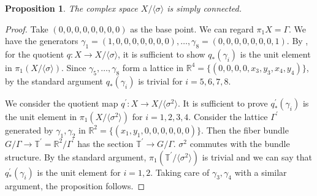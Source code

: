 \documentclass[12pt,reqno]{amsart}
\newtheorem{prop}[thm]{Proposition}
\theoremstyle{definition}
\newcommand{\Z}{\mathbb{Z}}
\newcommand{\R}{\mathbb{R}}
\newcommand{\C}{\mathbb{C}}
\newcommand{\T}{\mathbb{T}}
\begin{document}




\begin{prop}
 The complex space $X/\langle\sigma \rangle$ is simply connected. 
\end{prop}
\begin{proof}
Take $(0,0,0,0,0,0,0,0)$ as the base point.
We can regard $\pi_{1}X=\Gamma$.
We have the generators 
$\gamma_{1}=(1,0,0,0,0,0,0,0),\dots ,\gamma_{8}=(0,0,0,0,0,0,0,1)$.
By \cite[Corollary 6.3]{Bre}, for the quotient $q:X\to X /\langle\sigma \rangle$, it is sufficient to show $q_{*}(\gamma_{i})$ is the unit element in $\pi_{1}(X/\langle\sigma \rangle)$.
Since $\gamma_{5},\dots, \gamma_{8}$ form a lattice in $\R^{4}=\{(0,0,0,0,x_3,y_3,x_4,y_4)\}$,
by the standard argument $q_{*}(\gamma_{i})$ is trivial for $i=5,6,7,8$.

We consider the quotient map $q^{'}:X\to X /\langle\sigma^2 \rangle$.
It is sufficient to prove $q^{'}_{*}(\gamma_{i})$ is the unit element in $\pi_{1}(X/\langle\sigma^2 \rangle)$ for $i=1,2,3,4$.
Consider the lattice $\Gamma^{'}$ generated by $\gamma_{1}, \gamma_{2}$ in $\R^{2}=\{(x_{1},y_{1},0,0,0,0,0,0)\}$.
Then the fiber bundle $G/\Gamma\to \T^{'}= \R^{2}/\Gamma^{'}$ has  the section $ \T^{'}\to G/\Gamma$.
$\sigma^2$ commutes with the bundle structure.
By the standard argument, $\pi_{1}(\T^{'}/\langle\sigma^2 \rangle)$ is trivial and we can say that $q^{'}_{*}(\gamma_{i})$ is the unit element for $i=1,2$. Taking care of $\gamma_{3}, \gamma_{4}$ with a similar argument, the proposition follows. \end{proof}
\end{document}
